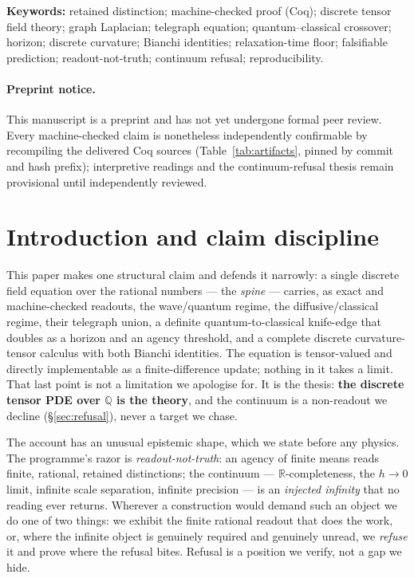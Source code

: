 \documentclass[10pt,twocolumn]{article}
\theoremstyle{definition}
\begin{document}
\noindent\textbf{Keywords:} retained distinction; machine-checked proof (Coq); discrete
tensor field theory; graph Laplacian; telegraph equation; quantum--classical crossover;
horizon; discrete curvature; Bianchi identities; relaxation-time floor; falsifiable
prediction; readout-not-truth; continuum refusal; reproducibility.

\paragraph*{Preprint notice.} This manuscript is a preprint and has not yet undergone
formal peer review. Every machine-checked claim is nonetheless independently confirmable
by recompiling the delivered Coq sources (Table~\ref{tab:artifacts}, pinned by commit and
hash prefix); interpretive readings and the continuum-refusal thesis remain provisional
until independently reviewed.

\section{Introduction and claim discipline}\label{sec:intro}

This paper makes one structural claim and defends it narrowly: a single discrete field
equation over the rational numbers --- the \emph{spine} --- carries, as exact and
machine-checked readouts, the wave/quantum regime, the diffusive/classical regime, their
telegraph union, a definite quantum-to-classical knife-edge that doubles as a horizon and
an agency threshold, and a complete discrete curvature-tensor calculus with both Bianchi
identities. The equation is tensor-valued and directly implementable as a finite-difference
update; nothing in it takes a limit. That last point is not a limitation we apologise for.
It is the thesis: \textbf{the discrete tensor PDE over $\mathbb{Q}$ is the theory}, and the
continuum is a non-readout we decline (\S\ref{sec:refusal}), never a target we chase.

The account has an unusual epistemic shape, which we state before any physics. The
programme's razor is \emph{readout-not-truth}: an agency of finite means reads finite,
rational, retained distinctions; the continuum --- $\mathbb{R}$-completeness, the $h\!\to\!0$
limit, infinite scale separation, infinite precision --- is an \emph{injected infinity}
that no reading ever returns. Wherever a construction would demand such an object we do one
of two things: we exhibit the finite rational readout that does the work, or, where the
infinite object is genuinely required and genuinely unread, we \emph{refuse} it and prove
where the refusal bites. Refusal is a position we verify, not a gap we hide.
\end{document}
